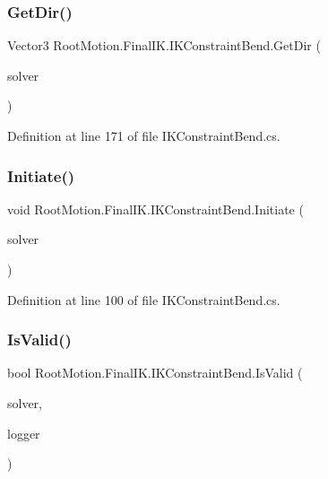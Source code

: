 \subsubsection{\texorpdfstring{Get\+Dir()}{GetDir()}}
{\footnotesize\ttfamily Vector3 Root\+Motion.\+Final\+I\+K.\+I\+K\+Constraint\+Bend.\+Get\+Dir (\begin{DoxyParamCaption}\item[{\mbox{\hyperlink{class_root_motion_1_1_final_i_k_1_1_i_k_solver_full_body}{I\+K\+Solver\+Full\+Body}}}]{solver }\end{DoxyParamCaption})}



Definition at line 171 of file I\+K\+Constraint\+Bend.\+cs.

\mbox{\label{class_root_motion_1_1_final_i_k_1_1_i_k_constraint_bend_aea4a2e10fa5909248e31dbc265eaabc4}} 
\subsubsection{\texorpdfstring{Initiate()}{Initiate()}}
{\footnotesize\ttfamily void Root\+Motion.\+Final\+I\+K.\+I\+K\+Constraint\+Bend.\+Initiate (\begin{DoxyParamCaption}\item[{\mbox{\hyperlink{class_root_motion_1_1_final_i_k_1_1_i_k_solver_full_body}{I\+K\+Solver\+Full\+Body}}}]{solver }\end{DoxyParamCaption})}



Definition at line 100 of file I\+K\+Constraint\+Bend.\+cs.

\mbox{\label{class_root_motion_1_1_final_i_k_1_1_i_k_constraint_bend_ac46456389e0db3ba3d368b6b3360c7f6}} 
\subsubsection{\texorpdfstring{Is\+Valid()}{IsValid()}}
{\footnotesize\ttfamily bool Root\+Motion.\+Final\+I\+K.\+I\+K\+Constraint\+Bend.\+Is\+Valid (\begin{DoxyParamCaption}\item[{\mbox{\hyperlink{class_root_motion_1_1_final_i_k_1_1_i_k_solver_full_body}{I\+K\+Solver\+Full\+Body}}}]{solver,  }\item[{Warning.\+Logger}]{logger }\end{DoxyParamCaption})}



